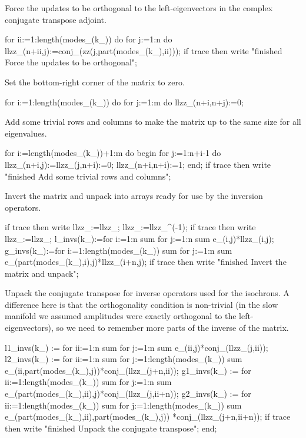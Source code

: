 \documentclass[11pt,a5paper]{article}
\begin{document}
Force the updates to be orthogonal to the left-eigenvectors
in the complex conjugate transpose adjoint.
\begin{reduce}
  for ii:=1:length(modes_(k_)) do for j:=1:n do 
      llzz_(n+ii,j):=conj_(zz(j,part(modes_(k_),ii)));
  if trace then write "finished Force the updates to be orthogonal";
\end{reduce}

Set the bottom-right corner of the matrix to zero.
\begin{reduce}
  for i:=1:length(modes_(k_)) do 
    for j:=1:m do llzz_(n+i,n+j):=0;
\end{reduce}

Add some trivial rows and columns to make the matrix up to
the same size for all eigenvalues.
\begin{reduce}
  for i:=length(modes_(k_))+1:m do begin 
    for j:=1:n+i-1 do llzz_(n+i,j):=llzz_(j,n+i):=0;
    llzz_(n+i,n+i):=1;
  end;
  if trace then write "finished Add some trivial rows and columns";
\end{reduce}

Invert the matrix and unpack into arrays ready for use by
the inversion operators.
\begin{reduce}
  if trace then write llzz_:=llzz_; 
  llzz_:=llzz_^(-1);
  if trace then write llzz_:=llzz_;
  l_invs(k_):=for i:=1:n sum for j:=1:n sum e_(i,j)*llzz_(i,j);
  g_invs(k_):=for i:=1:length(modes_(k_)) sum 
    for j:=1:n sum e_(part(modes_(k_),i),j)*llzz_(i+n,j);
if trace then write "finished Invert the matrix and unpack";
\end{reduce}

Unpack the conjugate transpose for inverse operators used
for the isochrons. A difference here is that the
orthogonality condition is non-trivial (in the slow manifold
we assumed amplitudes were exactly orthogonal to the
left-eigenvectors), so we need to remember more parts of the
inverse of the matrix.  
\begin{reduce}
  l1_invs(k_) := for ii:=1:n sum for j:=1:n sum 
      e_(ii,j)*conj_(llzz_(j,ii));
  l2_invs(k_) := for ii:=1:n sum 
      for j:=1:length(modes_(k_)) sum 
          e_(ii,part(modes_(k_),j))*conj_(llzz_(j+n,ii));
  g1_invs(k_) := for ii:=1:length(modes_(k_)) sum 
      for j:=1:n sum 
          e_(part(modes_(k_),ii),j)*conj_(llzz_(j,ii+n));
  g2_invs(k_) := for ii:=1:length(modes_(k_)) sum 
      for j:=1:length(modes_(k_)) sum 
          e_(part(modes_(k_),ii),part(modes_(k_),j))
          *conj_(llzz_(j+n,ii+n));
  if trace then write "finished Unpack the conjugate transpose";
end;
\end{reduce}
\end{document}
